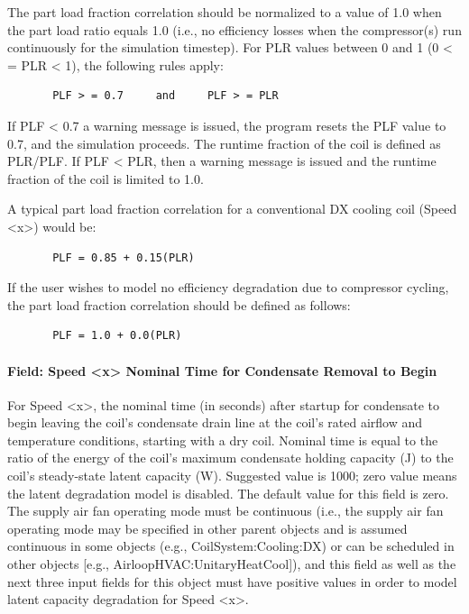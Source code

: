 The part load fraction correlation should be normalized to a value of 1.0 when the part load ratio equals 1.0 (i.e., no efficiency losses when the compressor(s) run continuously for the simulation timestep). For PLR values between 0 and 1 (0 \textless{} = PLR \textless{} 1), the following rules apply:

\begin{lstlisting}
       PLF > = 0.7     and     PLF > = PLR
\end{lstlisting}

If PLF \textless{} 0.7 a warning message is issued, the program resets the PLF value to 0.7, and the simulation proceeds. The runtime fraction of the coil is defined as PLR/PLF. If PLF \textless{} PLR, then a warning message is issued and the runtime fraction of the coil is limited to 1.0.

A typical part load fraction correlation for a conventional DX cooling coil (Speed \textless{}x\textgreater{}) would be:

\begin{lstlisting}
       PLF = 0.85 + 0.15(PLR)
\end{lstlisting}

If the user wishes to model no efficiency degradation due to compressor cycling, the part load fraction correlation should be defined as follows:

\begin{lstlisting}
       PLF = 1.0 + 0.0(PLR)
\end{lstlisting}

\paragraph{Field: Speed \textless{}x\textgreater{} Nominal Time for Condensate Removal to Begin}\label{field-speed-x-nominal-time-for-condensate-removal-to-begin}

For Speed \textless{}x\textgreater{}, the nominal time (in seconds) after startup for condensate to begin leaving the coil's condensate drain line at the coil's rated airflow and temperature conditions, starting with a dry coil. Nominal time is equal to the ratio of the energy of the coil's maximum condensate holding capacity (J) to the coil's steady-state latent capacity (W). Suggested value is 1000; zero value means the latent degradation model is disabled. The default value for this field is zero. The supply air fan operating mode must be continuous (i.e., the supply air fan operating mode may be specified in other parent objects and is assumed continuous in some objects (e.g., CoilSystem:Cooling:DX) or can be scheduled in other objects {[}e.g., AirloopHVAC:UnitaryHeatCool{]}), and this field as well as the next three input fields for this object must have positive values in order to model latent capacity degradation for Speed \textless{}x\textgreater{}.

